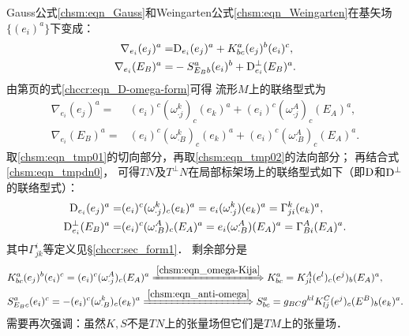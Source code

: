 Gauss公式\eqref{chsm:eqn_Gauss}和Weingarten公式\eqref{chsm:eqn_Weingarten}在基矢场$\{(e_i)^a\}$下变成：
\begin{subequations}\label{chsm:eqn_tmpdn0}
\begin{align}
    {\nabla}_{e_i} (e_j)^a =& {\rm D}_{e_i} (e_j)^a + K^a_{bc} (e_j)^b (e_i)^c, \\
    {\nabla}_{e_i} (E_B)^a =& - S^a_{E_B b} (e_i)^b + {\rm D}_{e_i} ^\bot (E_B)^a .
\end{align}
\end{subequations}
由第\pageref{chccr:eqn_D-omega-form}页的式\eqref{chccr:eqn_D-omega-form}可得
流形$M$上的联络型式为
\begin{subequations}\label{chsm:eqn_tmp0121}
\begin{align}
    \nabla_{e_i} (e_j)^a=  &(e_i)^c(\omega_{\cdot j}^{k})_c (e_k)^a +(e_i)^c(\omega_{\cdot j}^{A})_c
    (E_A)^a, \label{chsm:eqn_tmp01} \\
    \nabla_{e_i} (E_B)^a=&(e_i)^c (\omega_{\cdot B}^{k})_c (e_k)^a +(e_i)^c(\omega_{\cdot B}^{A})_c
    (E_A)^a. \label{chsm:eqn_tmp02}
\end{align}
\end{subequations}
取\eqref{chsm:eqn_tmp01}的切向部分，再取\eqref{chsm:eqn_tmp02}的法向部分；
再结合式\eqref{chsm:eqn_tmpdn0}，
可得$T N$及$T^\bot N$在局部标架场上的联络型式如下（即${\rm D}$和${\rm D}^\bot$的联络型式）：
\begin{subequations}\label{chsm:eqn_Dbotij}
\begin{align}
    {\rm D}_{e_i} (e_j)^a=&  (e_i)^c(\omega_{\cdot j}^{k})_c (e_k)^a
    = e_i(\omega_{\cdot j}^{k}) (e_k)^a = \Gamma_{ji}^{k} (e_k)^a , \label{chsm:eqn_Dij} \\
    {\rm D}^\bot_{e_i} (E_B)^a=& (e_i)^c(\omega_{\cdot B}^{A})_c (E_A)^a
    =e_i(\omega_{\cdot B}^{A}) (E_A)^a =\Gamma_{B i}^{A} (E_A)^a .
    \label{chsm:eqn_Dbotimu}
\end{align}
\end{subequations}
其中$\Gamma^i_{jk}$等定义见\S\ref{chccr:sec_form1}．
剩余部分是
\begin{align}
    &K^a_{bc} (e_j)^b (e_i)^c = (e_i)^c(\omega_{\cdot j}^{A})_c (E_A)^a
    \xLongrightarrow{\ref{chsm:eqn_omega-Kija}}
    K^a_{bc} %
    = K^A_{jl} (e^l)_c (e^j)_b (E_A)^a ,  \label{chsm:eqn_K-omega} \\
    &S^a_{E_B c} (e_i)^c = -(e_i)^c (\omega_{\cdot B}^{k})_c (e_k)^a
    \xLongrightarrow{\ref{chsm:eqn_anti-omega}}
    S^a_{bc}  %
    = g_{B C} g^{kl} K_{lj}^C (e^j)_c (E^B)_b (e_k)^a . \label{chsm:eqn_S-omega}
\end{align}  %
需要再次强调：虽然$K,S$不是$TN$上的张量场但它们是$TM$上的张量场．

